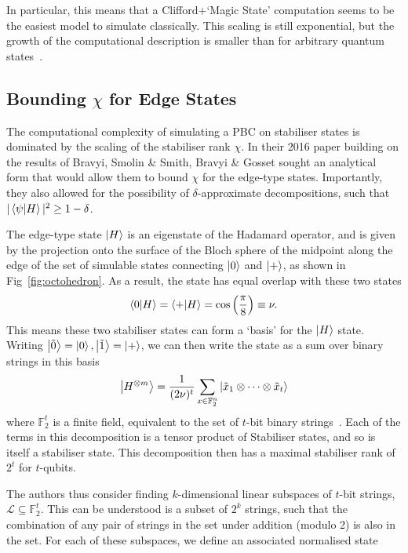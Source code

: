 \documentclass{standalone}
\begin{document}
In particular, this means that a Clifford+`Magic State' computation seems to be the easiest model to simulate classically. This scaling is still exponential, but the growth of the computational description is smaller than for arbitrary quantum states~\cite{Bravyi2015}. 
\subsection{Bounding $\chi$ for Edge States}\label{sec:edgebound}
The computational complexity of simulating a PBC on stabiliser states is dominated by the scaling of the stabiliser rank $\chi$. In their 2016 paper building on the results of Bravyi, Smolin \& Smith, Bravyi \& Gosset sought an analytical form that would allow them to bound $\chi$ for the edge-type states. Importantly, they also allowed for the possibility of $\delta$-approximate decompositions, such that $\vert\braket{\psi}{H}\vert^{2}\geq 1-\delta$. 
\par
The edge-type state $\ket{H}$ is an eigenstate of the Hadamard operator, and is given by the projection onto the surface of the Bloch sphere of the midpoint along the edge of the set of simulable states connecting $\ket{0}$ and $\ket{+}$, as shown in Fig~\ref{fig:octohedron}. As a result, the state has equal overlap with these two states 
\[\braket{0}{H}=\braket{+}{H}=\cos\left(\frac{\pi}{8}\right)\equiv \nu.\]
This means these two stabiliser states can form a `basis' for the $\ket{H}$ state. Writing $\ket{\tilde{0}}=\ket{0},\ket{\tilde{1}}=\ket{+}$, we can then write the state as a sum over binary strings in this basis
\begin{equation}
  \label{eq:hstrings}
  \ket{H^{\otimes m}}=\frac{1}{(2\nu)^{t}}\sum_{x\in\mathbb{F}_{2}^{n}}\ket{\tilde{x}_{1}\otimes\cdots\otimes\tilde{x}_{t}}
\end{equation}
where $\mathbb{F}_{2}^{t}$ is a finite field, equivalent to the set of $t$-bit binary strings~\cite{Bravyi2016b}. Each of the terms in this decomposition is a tensor product of Stabiliser states, and so is itself a stabiliser state. This decomposition then has a maximal stabiliser rank of $2^{t}$ for $t$-qubits. 
\par
The authors thus consider finding $k$-dimensional linear subspaces of $t$-bit strings, $\mathcal{L}\subseteq\mathbb{F}_{2}^{t}$. This can be understood is a subset of $2^{k}$ strings, such that the combination of any pair of strings in the set under addition (modulo 2) is also in the set. For each of these subspaces, we define an associated normalised state~\cite{Bravyi2016b} 
\end{document}
